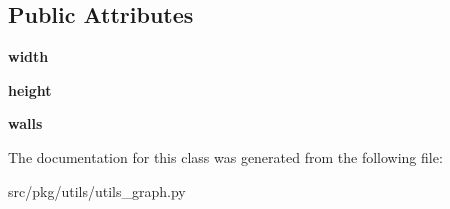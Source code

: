 \subsection*{Public Attributes}
\begin{DoxyCompactItemize}
\item 
\mbox{\label{classrnb-planning_1_1src_1_1pkg_1_1utils_1_1utils__graph_1_1_square_grid_a1b8739105c744a4e1ab92386e920e4bb}} 
{\bfseries width}
\item 
\mbox{\label{classrnb-planning_1_1src_1_1pkg_1_1utils_1_1utils__graph_1_1_square_grid_ae245fcb460dddb368e3909557ffc6721}} 
{\bfseries height}
\item 
\mbox{\label{classrnb-planning_1_1src_1_1pkg_1_1utils_1_1utils__graph_1_1_square_grid_a57cdfd98f3c21d4833070b682cec106b}} 
{\bfseries walls}
\end{DoxyCompactItemize}


The documentation for this class was generated from the following file\+:\begin{DoxyCompactItemize}
\item 
src/pkg/utils/utils\+\_\+graph.\+py\end{DoxyCompactItemize}
